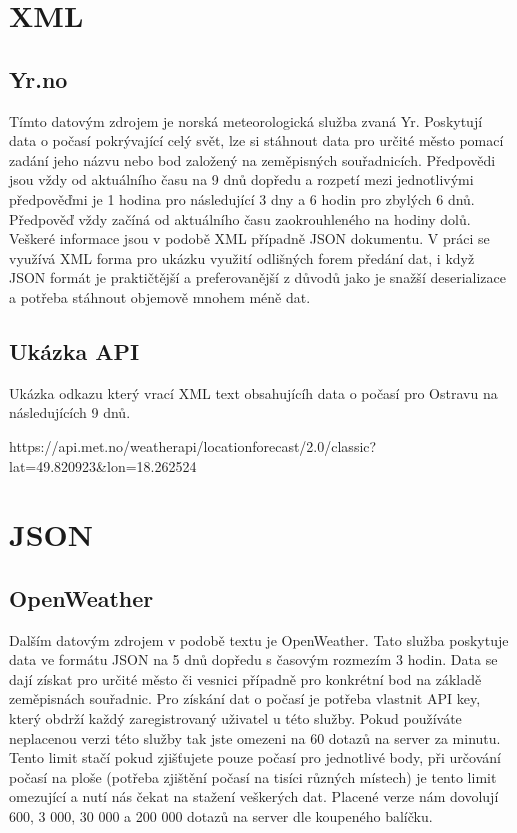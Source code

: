 \documentclass[czech,bachelor,dept460,male,csharp,cpdeclaration]{diploma}
\begin{document}
	\section{XML}
	\subsection{Yr.no}
	
	Tímto datovým zdrojem je norská meteorologická služba zvaná Yr. Poskytují data o počasí pokrývající celý svět, lze si stáhnout data pro určité město pomací zadání jeho názvu nebo bod založený na zeměpisných souřadnicích. Předpovědi jsou vždy od aktuálního času na 9 dnů dopředu a rozpetí mezi jednotlivými předpověďmi je 1 hodina pro následující 3 dny a 6 hodin pro zbylých 6 dnů. Předpověď vždy začíná od aktuálního času zaokrouhleného na hodiny dolů. Veškeré informace jsou v podobě XML případně JSON dokumentu. V práci se využívá XML forma pro ukázku využití odlišných forem předání dat, i když JSON formát je praktičtější a preferovanější z důvodů jako je snažší deserializace a potřeba stáhnout objemově mnohem méně dat.
	
	\subsection{Ukázka API}
	
	Ukázka odkazu který vrací XML text obsahujícíh data o počasí pro Ostravu na následujících 9 dnů.
	
	https://api.met.no/weatherapi/locationforecast/2.0/classic?lat=49.820923\&lon=18.262524
	
	\section{JSON}
	\subsection{OpenWeather}
	
	Dalším datovým zdrojem v podobě textu je OpenWeather. Tato služba poskytuje data ve formátu JSON na 5 dnů dopředu s časovým rozmezím 3 hodin. Data se dají získat pro určité město či vesnici případně pro konkrétní bod na základě zeměpisnách souřadnic. Pro získání dat o počasí je potřeba vlastnit API key, který obdrží každý zaregistrovaný uživatel u této služby. Pokud používáte neplacenou verzi této služby tak jste omezeni na 60 dotazů na server za minutu. Tento limit stačí pokud zjišťujete pouze počasí pro jednotlivé body, při určování počasí na ploše (potřeba zjištění počasí na tisíci různých místech) je tento limit omezující a nutí nás čekat na stažení veškerých dat. Placené verze nám dovolují 600, 3 000, 30 000 a 200 000 dotazů na server dle koupeného balíčku.
	
\end{document}
